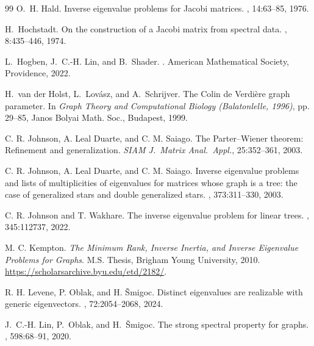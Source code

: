 \documentclass{article}
\theoremstyle{definition}
\begin{document}
\begin{thebibliography}{99}
O.~H. Hald.
\newblock Inverse eigenvalue problems for {J}acobi matrices.
, 14:63--85, 1976.

H.~Hochstadt.
\newblock On the construction of a {J}acobi matrix from spectral data.
, 8:435--446, 1974.

L.~Hogben, J.~C.-H. Lin, and B.~Shader.
.
\newblock American Mathematical Society, Providence, 2022.

H.~van der Holst, L.~Lov{\'a}sz, and A.~Schrijver.
\newblock The {C}olin de {V}erdi\`ere graph parameter.
\newblock In {\it Graph Theory and Computational Biology (Balatonlelle, 1996)},
  pp. 29--85, Janos Bolyai Math. Soc., Budapest, 1999.

C. R. Johnson, A. Leal Duarte, and C. M. Saiago. 
\newblock The Parter--Wiener theorem: Refinement and generalization. 
\newblock \emph{SIAM J.\ Matrix Anal.\ Appl.}, 25:352--361, 2003. 

C. R. Johnson, A. Leal Duarte, and C. M. Saiago.
\newblock Inverse eigenvalue problems and lists of multiplicities of eigenvalues for matrices whose graph is a tree: the case of generalized stars and double generalized stars.
, 373:311--330, 2003.

C. R. Johnson and T. Wakhare. 
\newblock The inverse eigenvalue problem for linear trees.
, 345:112737, 2022.

M. C. Kempton.
\newblock \emph{The Minimum Rank, Inverse Inertia, and Inverse Eigenvalue Problems for Graphs}.
\newblock M.S. Thesis, Brigham Young University, 2010. 
\newblock \url{https://scholarsarchive.byu.edu/etd/2182/}.


R. H. Levene, P. Oblak, and H. Šmigoc.  
\newblock Distinct eigenvalues are realizable with generic eigenvectors.
, 72:2054--2068, 2024. 

J.~C.-H. Lin, P.~Oblak, and H.~\v{S}migoc.
\newblock The strong spectral property for graphs.
, 598:68--91, 2020.


\end{thebibliography}
\end{document}
